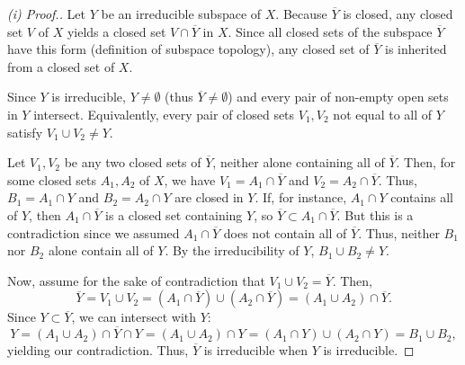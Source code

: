 \begin{proof}[(i) Proof.]
Let $Y$ be an irreducible subspace of $X$. Because $\overline{Y}$ is closed, any closed set $V$ of $X$ yields a
closed set $V \cap \overline{Y}$ in $X$. Since all closed sets of the subspace $\overline{Y}$ have this form (definition of subspace topology), 
any closed set of $\overline{Y}$ is inherited from a closed set of $X$.

Since $Y$ is irreducible, $Y \neq \emptyset$ (thus $\overline{Y} \neq \emptyset$) and every pair of non-empty open sets in $Y$ intersect. Equivalently, every pair of closed sets $V_1, V_2$ 
not equal to all of $Y$ satisfy $V_1 \cup V_2 \neq Y$.

Let $V_1, V_2$ be any two closed sets of $\overline{Y}$, neither alone containing all of $\overline{Y}$. Then, for some closed sets $A_1,A_2$ of $X$, we have
$V_1 = A_1 \cap \overline{Y}$ and $V_2 = A_2 \cap \overline{Y}$. Thus, $B_1 = A_1 \cap Y$ and $B_2 = A_2 \cap Y$ are closed in $Y$. If, 
for instance, $A_1 \cap Y$ contains all of $Y$, then $A_1 \cap \overline{Y}$ is a closed set containing $Y$, 
so $\overline{Y} \subset A_1 \cap \overline{Y}$. But this is a contradiction since we assumed $A_1 \cap \overline{Y}$ does not contain all of $\overline{Y}$. Thus,
neither $B_1$ nor $B_2$ alone contain all of $Y$. By the irreducibility of $Y$, $B_1 \cup B_2 \neq Y$. 

Now, assume for the sake of contradiction that $V_1 \cup V_2 = \overline{Y}$. Then,
$$\overline{Y} = V_1 \cup V_2 = (A_1 \cap \overline{Y}) \cup (A_2 \cap \overline{Y}) = (A_1 \cup A_2)\cap \overline{Y}.$$
Since $Y \subset \overline{Y}$, we can intersect with $Y$:
$$Y = (A_1 \cup A_2)\cap \overline{Y} \cap Y = (A_1 \cup A_2)\cap Y
= (A_1 \cap Y) \cup (A_2 \cap Y) = B_1 \cup B_2,$$
yielding our contradiction. Thus, $\overline{Y}$ is irreducible when $Y$ is irreducible.
\end{proof}

